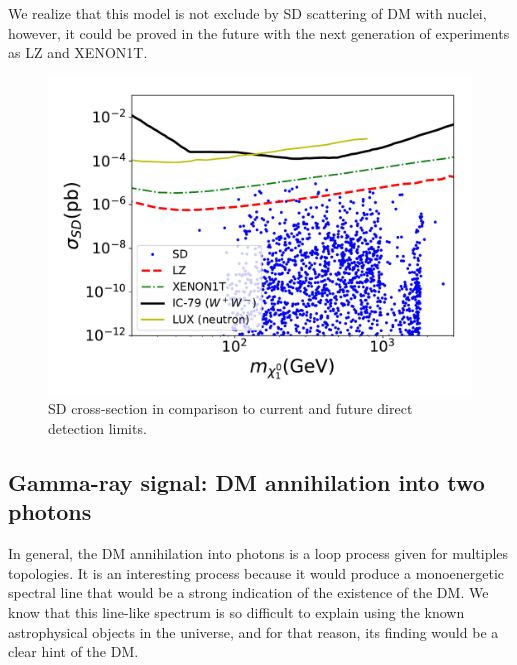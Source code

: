 \documentclass[12pt,letterpaper]{article}
\begin{document}
We realize that this model is not exclude by SD scattering of DM with nuclei, however, it could be proved in the future with the next generation of experiments as LZ and XENON1T.
%
\begin{figure}[h]
\begin{center}
\includegraphics[scale=0.5]{sigmaSD_with_neutrino_physics}
\caption{ SD cross-section  in comparison to current and future direct detection limits.  
}
\label{fig:SD-scan}
\end{center}
\end{figure}
%








\subsection{Gamma-ray signal: DM annihilation into two photons}
\label{sec:gamma-ray}
  
In general, the DM annihilation into photons is a loop process given for multiples topologies. 
It is an interesting process because it would produce a monoenergetic spectral line that would be a strong indication of the existence of the DM. We know that this line-like spectrum is so difficult to explain using the known astrophysical objects in the universe, and for that reason, its finding would be a clear hint of the DM.
     
\end{document}
